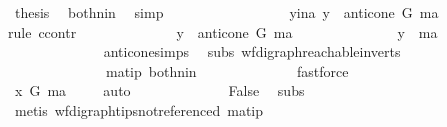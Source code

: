 \begin{isabellebody}
\ {\isacharquery}{\kern0pt}thesis\ \isamarkupfalse%
\ both{\isacharunderscore}{\kern0pt}nin\ \isamarkupfalse%
\ simp\ \isanewline
\ \ \ \ \ \ \isamarkupfalse%
\isanewline
\ \ \ \ \ \ \ \ \isamarkupfalse%
\ y{\isacharunderscore}{\kern0pt}ina{\isacharcolon}{\kern0pt}\ {\isachardoublequoteopen}y\ {\isasymin}\ anticone\ G\ ma{\isachardoublequoteclose}\ \isanewline
\ \ \ \ \ \ \ \ \isamarkupfalse%
{\isacharparenleft}{\kern0pt}rule\ ccontr{\isacharparenright}{\kern0pt}\ \isanewline
\ \ \ \ \ \ \ \ \ \ \isamarkupfalse%
\ {\isachardoublequoteopen}{\isasymnot}\ y\ {\isasymin}\ anticone\ G\ ma\ {\isachardoublequoteclose}\isanewline
\ \ \ \ \ \ \ \ \ \ \isamarkupfalse%
\ \isamarkupfalse%
\ {\isachardoublequoteopen}y\ {\isacharequal}{\kern0pt}\ ma{\isachardoublequoteclose}\isanewline
\ \ \ \ \ \ \ \ \ \ \ \ \isamarkupfalse%
\ anticone{\isachardot}{\kern0pt}simps\ \isamarkupfalse%
\ subs\ wf{\isacharunderscore}{\kern0pt}digraph{\isachardot}{\kern0pt}reachable{}{\isacharunderscore}{\kern0pt}in{\isacharunderscore}{\kern0pt}verts{\isacharparenleft}{\kern0pt}{}{\isacharparenright}{\kern0pt}\ {}{\isacharparenleft}{\kern0pt}{}{\isacharcomma}{\kern0pt}{}{\isacharparenright}{\kern0pt}\ \isanewline
\ \ \ \ \ \ \ \ \ \ \ \ \ \ ma{\isacharunderscore}{\kern0pt}tip\ both{\isacharunderscore}{\kern0pt}nin\isanewline
\ \ \ \ \ \ \ \ \ \ \ \ \isamarkupfalse%
\ fastforce\ \ \isanewline
\ \ \ \ \ \ \ \ \ \ \isamarkupfalse%
\ \isamarkupfalse%
\ {\isachardoublequoteopen}x\ {\isasymrightarrow}\isactrlsup {\isacharplus}{\kern0pt}\isactrlbsub G\isactrlesub \ ma{\isachardoublequoteclose}\ \isamarkupfalse%
\ {}{\isacharparenleft}{\kern0pt}{}{\isacharparenright}{\kern0pt}\ \isamarkupfalse%
\ auto\isanewline
\ \ \ \ \ \ \ \ \ \ \isamarkupfalse%
\ \isamarkupfalse%
\ False\ \isamarkupfalse%
\ subs\ \ {}{\isacharparenleft}{\kern0pt}{}{\isacharparenright}{\kern0pt}\isanewline
\ \ \ \ \ \ \ \ \ \ \ \ \isamarkupfalse%
\ {\isacharparenleft}{\kern0pt}metis\ wf{\isacharunderscore}{\kern0pt}digraph{\isachardot}{\kern0pt}tips{\isacharunderscore}{\kern0pt}not{\isacharunderscore}{\kern0pt}referenced\ ma{\isacharunderscore}{\kern0pt}tip{\isacharparenright}{\kern0pt}\ \ \isanewline

\end{isabellebody}
